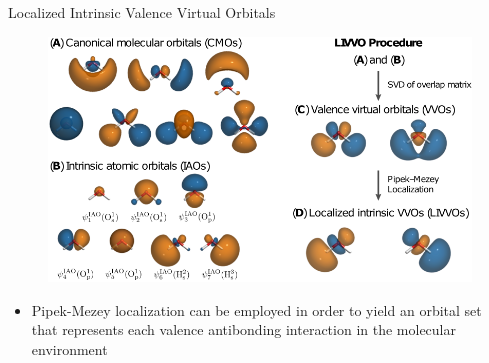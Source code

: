 \documentclass[t]{beamer}
\begin{document}
\begin{frame}{Localized Intrinsic Valence Virtual Orbitals}
\begin{figure}
\includegraphics[width=0.75\linewidth]{livvo_procedure_4.png}
\end{figure}
\begin{itemize}
\item Pipek-Mezey localization can be employed in order to yield an orbital set that represents each valence antibonding interaction in the molecular environment
\end{itemize}
\end{frame}
\end{document}
